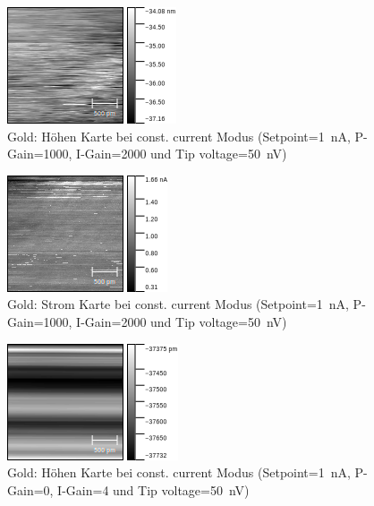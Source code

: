 \documentclass[sn-mathphys-num,iicol]{sn-jnl}
\theoremstyle{thmstyleone}
\theoremstyle{thmstyletwo}
\theoremstyle{thmstylethree}
\begin{document}
\begin{figure}[t]
        \centering
        \includegraphics[width=.5\textwidth]{../data/Graphit6_z.png}
        \caption{Gold: Höhen Karte bei const. current Modus (Setpoint=\SI{1}{\nano A}, P-Gain=\SI{1000}{}, I-Gain=\SI{2000}{} und Tip voltage=\SI{50}{\nano V})} \label{fig:gr6z}
\end{figure}
\begin{figure}[t]
        \centering
        \includegraphics[width=.5\textwidth]{../data/Graphit7_current.png}
        \caption{Gold: Strom Karte bei const. current Modus (Setpoint=\SI{1}{\nano A}, P-Gain=\SI{1000}{}, I-Gain=\SI{2000}{} und Tip voltage=\SI{50}{\nano V})} \label{fig:gr7c}
\end{figure}
\begin{figure}[t]
        \centering
        \includegraphics[width=.5\textwidth]{../data/Graphit7_z.png}
        \caption{Gold: Höhen Karte bei const. current Modus (Setpoint=\SI{1}{\nano A}, P-Gain=\SI{0}{}, I-Gain=\SI{4}{} und Tip voltage=\SI{50}{\nano V})} \label{fig:gr7z}
\end{figure}



\end{document}
